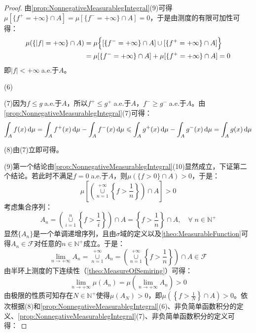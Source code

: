 \begin{proof}
	由\cref{prop:NonnegativeMeasurablegIntegral}(9)可得$\mu[\{f^+=+\infty\}\cap A]=\mu[\{f^-=+\infty\}\cap A]=0$，于是由测度的有限可加性可得：
	\begin{align*}
		\mu(\{|f|=+\infty\}\cap A)&=\mu\Bigl\{[\{f^-=+\infty\}\cap A]\cup[\{f^+=+\infty\}\cap A]\Bigr\} \\
		&=\mu[\{f^-=+\infty\}\cap A]+\mu[\{f^+=+\infty\}\cap A]=0
	\end{align*}
	即$|f|<+\infty\;$a.e.于$A$。\par
	(6)\par
	(7)因为$f\leqslant g\;$a.e.于$A$，所以$f^+\leqslant g^+\;$a.e.于$A$，$f^-\geqslant g^-\;$a.e.于$A$。由\cref{prop:NonnegativeMeasurablegIntegral}(7)可得：
	\begin{equation*}
		\int_{A}f(x)\mathop{}\!\mathrm{d}\mu=\int_{A}f^+(x)\mathop{}\!\mathrm{d}\mu-\int_{A}f^-(x)\mathop{}\!\mathrm{d}\mu\leqslant\int_{A}g^+(x)\mathop{}\!\mathrm{d}\mu-\int_{A}g^-(x)\mathop{}\!\mathrm{d}\mu=\int_{A}g(x)\mathop{}\!\mathrm{d}\mu
	\end{equation*}
	\par
	(8)由(7)立即可得。\par
	(9)第一个结论由\cref{prop:NonnegativeMeasurablegIntegral}(10)显然成立，下证第二个结论。若此时不满足$f=0\;$a.e.于$A$，则$\mu(\{f>0\}\cap A)>0$，于是：
	\begin{equation*}
		\mu\left[\left(\underset{n=1}{\overset{+\infty}{\cup}}\left\{f>\frac{1}{n}\right\}\right)\cap A\right]>0
	\end{equation*}
	考虑集合序列：
	\begin{equation*}
		A_n=\left(\underset{i=1}{\overset{n}{\cup}}\left\{f>\frac{1}{i}\right\}\right)\cap A=\left\{f>\frac{1}{n}\right\}\cap A,\quad\forall\;n\in\mathbb{N}^+
	\end{equation*}
	显然$\{A_n\}$是一个单调递增序列，且由$\sigma$域的定义以及\cref{theo:MeasurableFunction}可得$A_n\in\mathscr{F}$对任意的$n\in\mathbb{N}^+$成立。于是：
	\begin{equation*}
		\lim_{n\to+\infty}A_n=\underset{n=1}{\overset{+\infty}{\cup}}A_n=\left(\underset{n=1}{\overset{+\infty}{\cup}}\left\{f>\frac{1}{n}\right\}\right)\cap A\in\mathscr{F}
	\end{equation*}
	由半环上测度的下连续性（\cref{theo:MeasureOfSemiring}）可得：
	\begin{equation*}
		\lim_{n\to+\infty}\mu(A_n)=\mu\left(\lim_{n\to+\infty}A_n\right)>0
	\end{equation*}
	由极限的性质可知存在$N\in\mathbb{N}^+$使得$\mu(A_N)>0$，即$\mu\left(\left\{f>\frac{1}{N}\right\}\cap A\right)>0$。依次根据(8)和\cref{prop:NonnegativeMeasurablegIntegral}(6)、非负简单函数积分的定义、\cref{prop:NonnegativeMeasurablegIntegral}(7)、非负简单函数积分的定义可得：

\end{proof}
